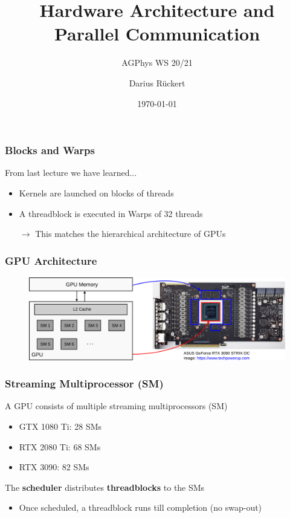 \documentclass[aspectratio=169,handout]{beamer}
\subtitle{AGPhys WS 20/21}
\title{Hardware Architecture and Parallel Communication}
\author[Darius Rückert]{Darius Rückert}
\date{\today}
\begin{document}
\frame
{
	\titlepage
}


\begin{frame}[fragile]
	\frametitle{Blocks and Warps}
	From last lecture we have learned...
	\begin{itemize}
		\item Kernels are launched on blocks of threads
		\item A threadblock is executed in Warps of 32 threads
		\item [$\rightarrow$] This matches the hierarchical architecture of GPUs
	\end{itemize}
\end{frame}

\frame
{
	\frametitle{GPU Architecture}
	\begin{figure}
		\includegraphics[width=1.0\textwidth]{arch}
	\end{figure}
}

\begin{frame}[fragile]
	\frametitle{Streaming Multiprocessor (SM)}
	A GPU consists of multiple streaming multiprocessors (SM)
	\begin{itemize}
		\item GTX 1080 Ti: 28 SMs
		\item RTX 2080 Ti: 68 SMs
		\item RTX 3090: 82 SMs
	\end{itemize}
	The \textbf{scheduler} distributes \textbf{threadblocks} to the SMs
		\begin{itemize}
			\item Once scheduled, a threadblock runs till completion (no swap-out)
		\end{itemize}
\end{frame}
\end{document}
